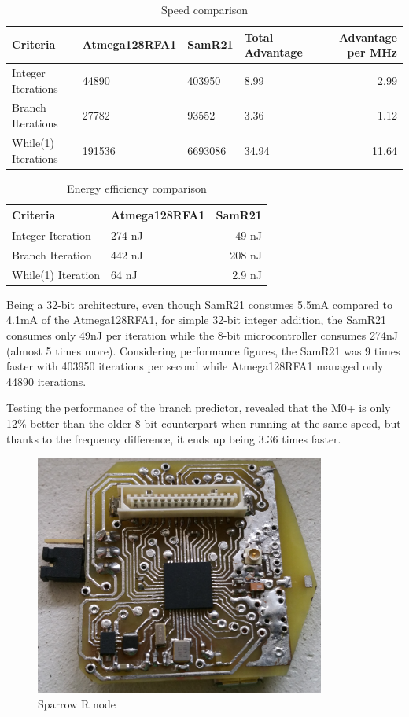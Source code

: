 \begin{table} \centering
\begin{tabular}{llllr}
\hline
Criteria    & Atmega128RFA1 & SamR21 & Total Advantage & Advantage per MHz \\
\hline
Integer Iterations      & 44890    & 403950   & 8.99 &  2.99 \\
Branch Iterations      & 27782    & 93552  &  3.36 &  1.12  \\
While(1) Iterations          & 191536     & 6693086    & 34.94  & 11.64  \\
\hline
\hline
\end{tabular}
\caption{Speed comparison}
\end{table}

\begin{table} \centering
\begin{tabular}{llr}
\hline
Criteria    & Atmega128RFA1 & SamR21 \\
\hline
Integer Iteration    &  274 nJ & 49 nJ \\
Branch Iteration      & 442 nJ & 208 nJ  \\
While(1) Iteration          & 64 nJ & 2.9 nJ \\
\hline
\hline
\end{tabular}
\caption{Energy efficiency comparison}
\end{table}

Being a 32-bit architecture, even though SamR21 consumes 5.5mA
compared to 4.1mA of the Atmega128RFA1, for simple 32-bit integer addition, the SamR21 consumes only 49nJ
per iteration while the 8-bit microcontroller consumes 274nJ (almost 5 times more). Considering
performance figures, the SamR21 was 9 times faster with 403950 iterations per second while
Atmega128RFA1 managed only 44890 iterations.

Testing the performance of the branch predictor, revealed that the M0+ is only 12\% better than
the older 8-bit counterpart when running at the same speed, but thanks to the frequency difference,
it ends up being 3.36 times faster.


\begin{figure}[ht] \centering
\includegraphics[width=0.85\textwidth]{img/sparrowrf.jpg}
\caption{Sparrow R node}
\end{figure}

